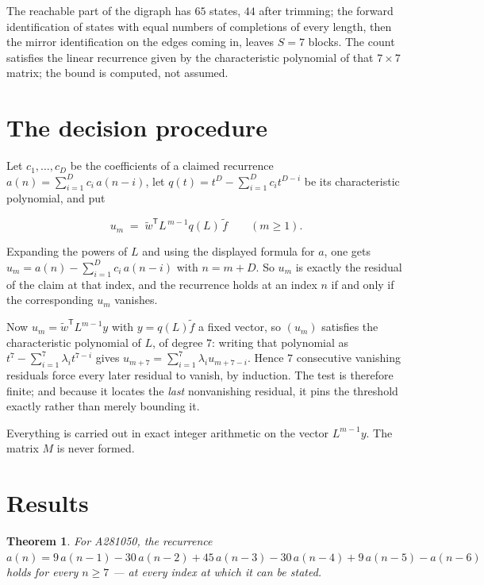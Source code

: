 \documentclass[11pt]{article}
\newtheorem{theorem}{Theorem}
\theoremstyle{definition}
\begin{document}
The reachable part of the digraph has $65$ states, $44$ after trimming; the forward identification of states with equal numbers of completions of every length, then the mirror identification on the edges coming in, leaves $S = 7$ blocks. The count satisfies the linear recurrence given by the characteristic polynomial of that $7\times7$ matrix; the bound is computed, not assumed.

\section{The decision procedure}

Let $c_1,\dots,c_D$ be the coefficients of a claimed recurrence $a(n) = \sum_{i=1}^{D} c_i\,a(n-i)$, let $q(t) = t^{D} - \sum_{i=1}^{D} c_i t^{D-i}$ be its characteristic polynomial, and put

\[u_m \;=\; \tilde w^{\mathsf T} L^{\,m-1} q(L)\,\tilde f \qquad (m \ge 1).\]

Expanding the powers of $L$ and using the displayed formula for $a$, one gets $u_m = a(n) - \sum_{i=1}^{D} c_i\,a(n-i)$ with $n = m + D$. So $u_m$ is exactly the residual of the claim at that index, and the recurrence holds at an index $n$ if and only if the corresponding $u_m$ vanishes.

Now $u_m = \tilde w^{\mathsf T} L^{m-1} y$ with $y = q(L)\tilde f$ a fixed vector, so $(u_m)$ satisfies the characteristic polynomial of $L$, of degree $7$: writing that polynomial as $t^{7} - \sum_{i=1}^{7} \lambda_i t^{7-i}$ gives $u_{m+7} = \sum_{i=1}^{7} \lambda_i u_{m+7-i}$. Hence $7$ consecutive vanishing residuals force every later residual to vanish, by induction. The test is therefore finite; and because it locates the {\itshape last} nonvanishing residual, it pins the threshold exactly rather than merely bounding it.

Everything is carried out in exact integer arithmetic on the vector $L^{m-1}y$. The matrix $M$ is never formed.

\section{Results}

\begin{theorem} For A281050, the recurrence $a(n) = 9\,a(n-1) - 30\,a(n-2) + 45\,a(n-3) - 30\,a(n-4) + 9\,a(n-5) - a(n-6)$ holds for every $n \ge 7$ --- at every index at which it can be stated.\end{theorem}
\end{document}

